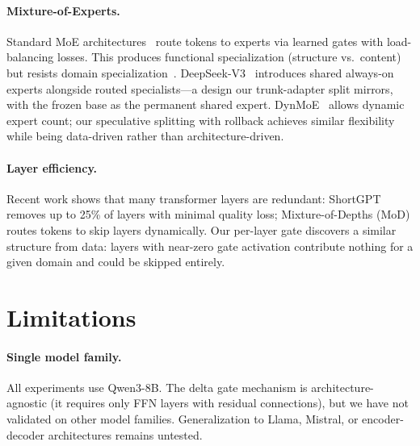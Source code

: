 \documentclass{article}
\begin{document}
\paragraph{Mixture-of-Experts.}
Standard MoE architectures~\cite{mixtral2024,deepseek2024moe,deepseekv3}
route tokens to experts via learned gates with load-balancing losses.
This produces functional specialization (structure vs.\ content) but
resists domain specialization~\cite{standing2026,openmoe2024,domaindriver2026}.
DeepSeek-V3~\cite{deepseekv3} introduces shared always-on experts
alongside routed specialists---a design our trunk-adapter split
mirrors, with the frozen base as the permanent shared expert.
DynMoE~\cite{l2r2026} allows dynamic expert count; our speculative
splitting with rollback achieves similar flexibility while being
data-driven rather than architecture-driven.

\paragraph{Layer efficiency.}
Recent work shows that many transformer layers are redundant: ShortGPT
removes up to 25\% of layers with minimal quality loss; Mixture-of-Depths
(MoD) routes tokens to skip layers dynamically. Our per-layer gate
discovers a similar structure from data: layers with near-zero gate
activation contribute nothing for a given domain and could be skipped
entirely.

\section{Limitations}
\label{sec:limitations}

\paragraph{Single model family.}
All experiments use Qwen3-8B. The delta gate mechanism is
architecture-agnostic (it requires only FFN layers with residual
connections), but we have not validated on other model families.
Generalization to Llama, Mistral, or encoder-decoder architectures
remains untested.
\end{document}
